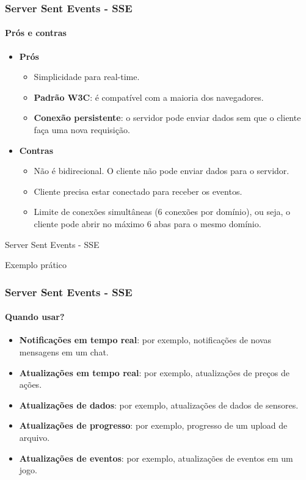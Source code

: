 \documentclass[
	9pt, %
	t, %
]{beamer}
\begin{document}
\begin{frame}
	\frametitle{Server Sent Events - SSE}
	\framesubtitle{Prós e contras}

	\begin{itemize}
		\item \textbf{Prós}
		\begin{itemize}
			\item Simplicidade para real-time.
			\item \textbf{Padrão W3C}: é compatível com a maioria dos navegadores.
			\item \textbf{Conexão persistente}: o servidor pode enviar dados sem que o cliente faça uma nova requisição.
		\end{itemize}
		\item \textbf{Contras}
		\begin{itemize}
			\item \alert{Não é bidirecional}. O cliente não pode enviar dados para o servidor.
			\item Cliente precisa estar \alert{conectado} para receber os eventos.
			\item \alert{Limite de conexões simultâneas} (6 conexões por domínio), ou seja, o cliente pode abrir no máximo 6 abas para o mesmo domínio.
		\end{itemize}

	\end{itemize}

\end{frame}

\begin{frame}
	\begin{center}
		
		\bigskip\bigskip\bigskip\bigskip %
		{\Large Server Sent Events - SSE}
		
		\bigskip\bigskip %
		{\Huge Exemplo prático}
		
	\end{center}

\end{frame}

\begin{frame}
	\frametitle{Server Sent Events - SSE}
	\framesubtitle{Quando usar?}

	\begin{itemize}
		\item \textbf{Notificações em tempo real}: por exemplo, notificações de novas mensagens em um chat.
		\item \textbf{Atualizações em tempo real}: por exemplo, atualizações de preços de ações.
		\item \textbf{Atualizações de dados}: por exemplo, atualizações de dados de sensores.
		\item \textbf{Atualizações de progresso}: por exemplo, progresso de um upload de arquivo.
		\item \textbf{Atualizações de eventos}: por exemplo, atualizações de eventos em um jogo.
	\end{itemize}

\end{frame}
\end{document}
